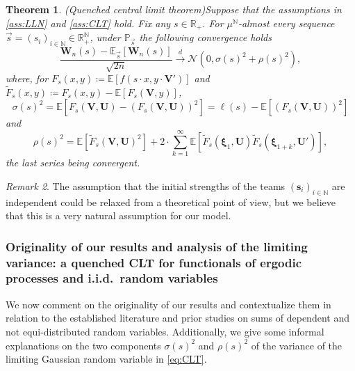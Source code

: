 \documentclass[11pt,a4paper,oneside]{article}
\newtheorem{thm}{Theorem}[section]
\theoremstyle{definition}
\theoremstyle{remark}
\newtheorem{rem}[thm]{Remark}
\def\N{\mathbb{N}}
\def\E{\mathbb{E}}
\def\P{\mathbb{P}}
\def\R{\mathbb{R}}
\begin{document}
\begin{thm}(Quenched central limit theorem)\label{thm:CLT}
	Suppose that the assumptions in \cref{ass:LLN} and \cref{ass:CLT} hold. Fix any $s\in\R_+$. For $\mu^{\N}$-almost every sequence $\vec{s}=(s_i)_{i\in\N}\in\R^{\N}_{+}$, under $\P_{\vec{s}}$ the following convergence holds
	\begin{equation}\label{eq:CLT}
	\frac{\bm W_n(s)- \E_{\vec{s}}[\bm W_n(s)] }{\sqrt{2n}}\xrightarrow{d} \bm{\mathcal{N}}\left(0,\sigma(s)^2 + \rho(s)^2\right), 
	\end{equation}
where, for $F_s(x,y)\coloneqq\E\left[f\left(s\cdot x,y\cdot \bm V'\right)\right]$ and $\tilde F_s \left(x,y\right) \coloneqq F_s\left(x,y \right) - \E[F_s\left(\bm V, y\right)]$,
\begin{equation}\label{eq:variance1_CLT}
	\sigma(s)^2=\E\left[F_s(\bm V,\bm U)-\left(F_s(\bm V,\bm U)\right)^2\right]=\ell(s)-\E\left[\left(F_s(\bm V,\bm U)\right)^2\right]
\end{equation}
and
\begin{equation}\label{eq:def_rho_s}
	\rho(s)^2=  \E \left[ \tilde F_s (\bm V, \bm U)^2 \right] + 2 \cdot \sum_{k=1}^{\infty} \E\left[ \tilde F_s(\bm{\xi}_1, \bm U) \tilde F_s (\bm{\xi}_{1+k}, \bm U') \right],
\end{equation}
the last series being convergent.
\end{thm}

\begin{rem}
	The assumption that the initial strengths of the teams $(\bm s_i)_{i\in\N}$ are independent could be relaxed from a theoretical point of view, but we believe that this is a very natural assumption for our model. 
\end{rem}

\subsubsection{Originality of our results and analysis of the limiting variance: a quenched CLT for functionals of ergodic processes and i.i.d.\ random variables}\label{sect:litterature_sum_var}
We now comment on the originality of our results and contextualize them in relation to the established  literature and prior studies on sums of dependent and not equi-distributed random variables. Additionally, we give some informal explanations  on the two components $\sigma(s)^2$ and $\rho(s)^2$ of the variance of the limiting Gaussian random variable in \cref{eq:CLT}. 
\end{document}
